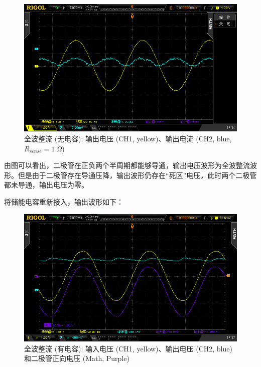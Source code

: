 \documentclass[UTF8]{article}
\begin{document}
\begin{figure}[H]\centering
    \includegraphics[width=\columnwidth]{LCE-01-二极管/assets/二极管整流电路/全波整流-无电容-电流波形.png}
    \caption{全波整流 (无电容): 输出电压 (CH1, yellow)、输出电流 (CH2, blue, $R_{sense} = 1\ \Omega$)}
\end{figure}

由图可以看出，二极管在正负两个半周期都能够导通，输出电压波形为全波整流波形。但是由于二极管存在导通压降，输出波形仍存在“死区”电压，此时两个二极管都未导通，输出电压为零。

将储能电容重新接入，输出波形如下：

\begin{figure}[H]\centering
    \includegraphics[width=\columnwidth]{LCE-01-二极管/assets/二极管整流电路/全波整流-接电容-电压波形.png}
    \caption{全波整流 (有电容): 输入电压 (CH1, yellow)、输出电压 (CH2, blue) 和二极管正向电压 (Math, Purple)}
\end{figure}
\end{document}
